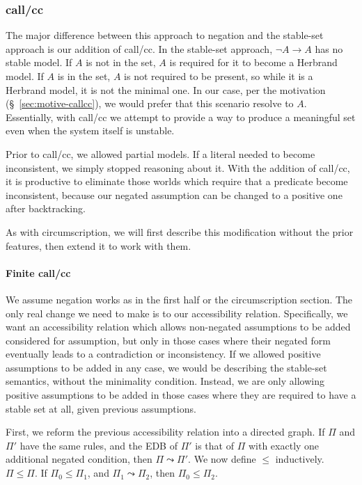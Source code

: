\subsubsection{call/cc}
The major difference between this approach to negation and the stable-set approach is our addition of call/cc.
In the stable-set approach, $\neg A \rightarrow A$ has no stable model.
If $A$ is not in the set, $A$ is required for it to become a Herbrand model.
If $A$ is in the set, $A$ is not required to be present, so while it is a Herbrand model, it is not the minimal one.
In our case, per the motivation (\S~\ref{sec:motive-callcc}), we would prefer that this scenario resolve to $A$.
Essentially, with call/cc we attempt to provide a way to produce a meaningful set even when the system itself is unstable.

Prior to call/cc, we allowed partial models.
If a literal needed to become inconsistent, we simply stopped reasoning about it.
With the addition of call/cc, it is productive to eliminate those worlds which require that a predicate become inconsistent, because our negated assumption can be changed to a positive one after backtracking.

As with circumscription, we will first describe this modification without the prior features, then extend it to work with them.

\paragraph{Finite call/cc}
We assume negation works as in the first half or the circumscription section.
The only real change we need to make is to our accessibility relation.
Specifically, we want an accessibility relation which allows non-negated assumptions to be added considered for assumption, but only in those cases where their negated form eventually leads to a contradiction or inconsistency.
If we allowed positive assumptions to be added in any case, we would be describing the stable-set semantics, without the minimality condition.
Instead, we are only allowing positive assumptions to be added in those cases where they are required to have a stable set at all, given previous assumptions.

First, we reform the previous accessibility relation into a directed graph.
If $\Pi$ and $\Pi'$ have the same rules, and the EDB  of $\Pi'$ is that of $\Pi$ with exactly one additional negated condition, then $\Pi \leadsto \Pi'$.
We now define $\leq$ inductively.
$\Pi \leq \Pi$.
If $\Pi_0 \leq \Pi_1$, and $\Pi_1 \leadsto \Pi_2$, then $\Pi_0 \leq \Pi_2$.

